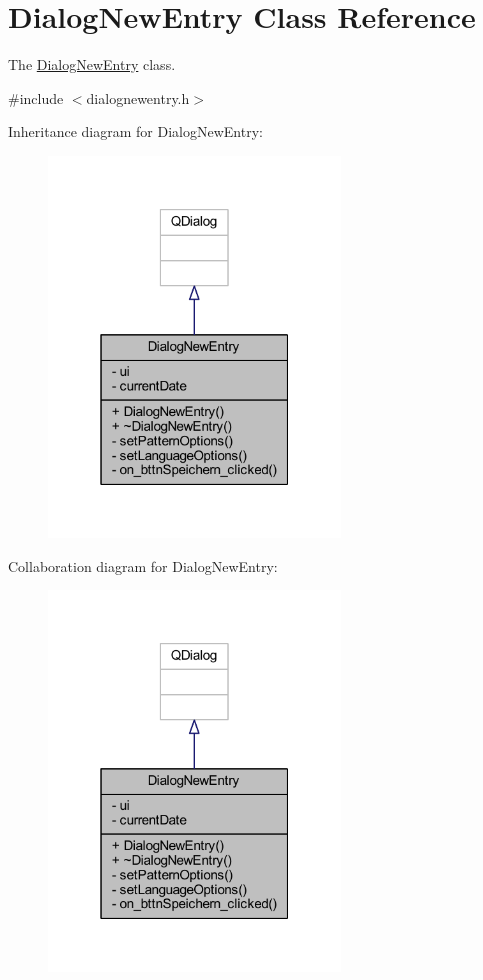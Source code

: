 \hypertarget{class_dialog_new_entry}{\section{Dialog\+New\+Entry Class Reference}
\label{class_dialog_new_entry}
}


The \hyperlink{class_dialog_new_entry}{Dialog\+New\+Entry} class.  




{\ttfamily \#include $<$dialognewentry.\+h$>$}



Inheritance diagram for Dialog\+New\+Entry\+:
\nopagebreak
\begin{figure}[H]
\begin{center}
\leavevmode
\includegraphics[width=220pt]{class_dialog_new_entry__inherit__graph}
\end{center}
\end{figure}


Collaboration diagram for Dialog\+New\+Entry\+:
\nopagebreak
\begin{figure}[H]
\begin{center}
\leavevmode
\includegraphics[width=220pt]{class_dialog_new_entry__coll__graph}
\end{center}
\end{figure}
